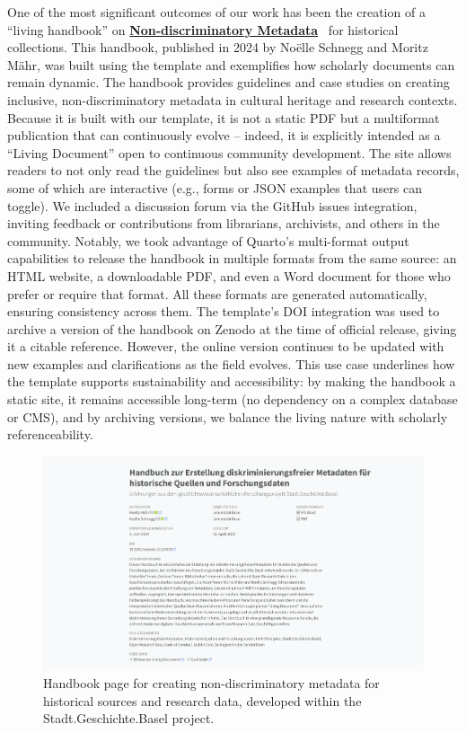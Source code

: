 \documentclass{anthology-ch}         %
\begin{document}
One of the most significant outcomes of our work has been the creation of a ``living handbook'' on \href{https://maehr.github.io/diskriminierungsfreie-metadaten/}{\textbf{Non-discriminatory Metadata}}~\cite{maehr2024d} for historical collections. This handbook, published in 2024 by Noëlle Schnegg and Moritz Mähr, was built using the template and exemplifies how scholarly documents can remain dynamic. The handbook provides guidelines and case studies on creating inclusive, non-discriminatory metadata in cultural heritage and research contexts. Because it is built with our template, it is not a static PDF but a multiformat publication that can continuously evolve -- indeed, it is explicitly intended as a ``Living Document'' open to continuous community development. The site allows readers to not only read the guidelines but also see examples of metadata records, some of which are interactive (e.g., forms or JSON examples that users can toggle). We included a discussion forum via the GitHub issues integration, inviting feedback or contributions from librarians, archivists, and others in the community. Notably, we took advantage of Quarto's multi-format output capabilities to release the handbook in multiple formats from the same source: an HTML website, a downloadable PDF, and even a Word document for those who prefer or require that format. All these formats are generated automatically, ensuring consistency across them. The template's DOI integration was used to archive a version of the handbook on Zenodo at the time of official release, giving it a citable reference. However, the online version continues to be updated with new examples and clarifications as the field evolves. This use case underlines how the template supports sustainability and accessibility: by making the handbook a static site, it remains accessible long-term (no dependency on a complex database or CMS), and by archiving versions, we balance the living nature with scholarly referenceability.

\begin{figure}[t!]
  \centering
  \includegraphics[width=0.9\linewidth]{images/diskriminierungsfreie_metadaten.png}
  \caption{Handbook page for creating non-discriminatory metadata for historical sources and research data, developed within the Stadt.Geschichte.Basel project.}
  \label{fig-discriminationfree-metadata}
\end{figure}
\end{document}
